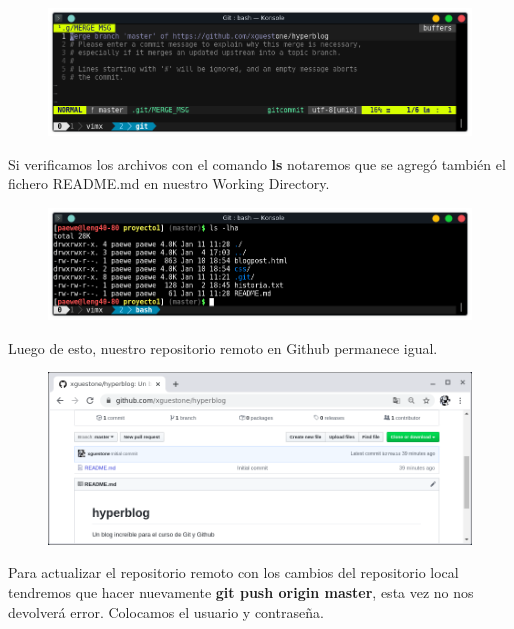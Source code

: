 \documentclass{article}
\begin{document}
\begin{figure}[h!]
  \centering
  \includegraphics[scale=0.75]{./Pictures/194_commit_message.png}
\end{figure}

Si verificamos los archivos con el comando \textbf{ls} notaremos que se agregó
también el fichero README.md en nuestro Working Directory.

\newpage

\begin{figure}[h!]
  \centering
  \includegraphics[scale=0.75]{./Pictures/195_ls.png}
\end{figure}

Luego de esto, nuestro repositorio remoto en Github permanece igual.

\begin{figure}[h!]
  \centering
  \includegraphics[scale=0.75]{./Pictures/196_github_igual.png}
\end{figure}

Para actualizar el repositorio remoto con los cambios del repositorio local
tendremos que hacer nuevamente \textbf{git push origin master}, esta vez no nos
devolverá error. Colocamos el usuario y contraseña.
\end{document}
